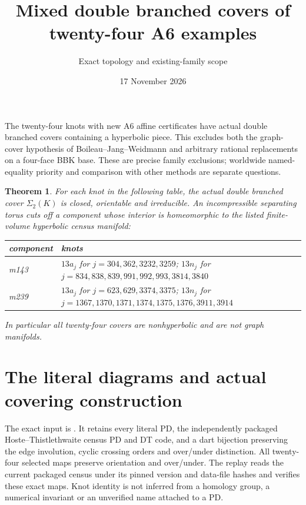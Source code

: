 \documentclass[11pt]{article}
\title{Mixed double branched covers of twenty-four A6 examples}
\author{Exact topology and existing-family scope}
\date{17 November 2026}
\newtheorem{theorem}{Theorem}
\begin{document}
\maketitle

The twenty-four knots with new A6 affine certificates have actual
double branched covers containing a hyperbolic piece. This excludes
both the graph-cover hypothesis of Boileau--Jang--Weidmann and
arbitrary rational replacements on a four-face BBK base.
These are precise family exclusions; worldwide named-equality
priority and comparison with other methods are separate questions.

\begin{theorem}\label{thm:outside}
For each knot in the following table, the actual double branched
cover $\Sigma_2(K)$ is closed, orientable and irreducible.
An incompressible separating torus cuts off a component whose
interior is homeomorphic to the listed finite-volume hyperbolic
census manifold:
\begin{center}\small
\begin{tabular}{lp{11.5cm}}
\toprule
component & knots\\
\midrule
m143 & $13a_j$ for $j=304,362,3232,3259$;\newline
$13n_j$ for $j=834,838,839,991,992,993,3814,3840$\\[2pt]
m239 & $13a_j$ for $j=623,629,3374,3375$;\newline
$13n_j$ for $j=1367,1370,1371,1374,1375,1376,3911,3914$\\
\bottomrule
\end{tabular}
\end{center}
In particular all twenty-four covers are nonhyperbolic and are not
graph manifolds.
\end{theorem}

\section{The literal diagrams and actual covering construction}

The exact input is .
It retains every literal PD, the independently packaged
Hoste--Thistlethwaite census PD and DT code, and a dart bijection
preserving the edge involution, cyclic crossing orders and
over/under distinction. All twenty-four selected maps preserve
orientation and over/under. The replay reads the current packaged
census under its pinned version and data-file hashes and verifies
these exact maps. Knot identity is not inferred from a homology
group, a numerical invariant or an unverified name attached to a PD.
\end{document}
